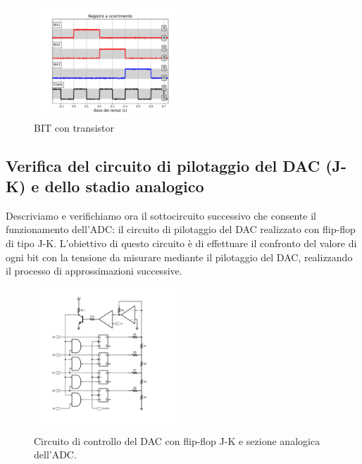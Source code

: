 \documentclass[journal]{IEEEtran}
\begin{document}
\begin{figure}[H]%
\begin{center}
\includegraphics[trim = {0 0 0 0}, clip, width=0.50\textwidth]{analysis/output/reg_test.pdf}
\caption{BIT con transistor}
\label{fig:BIT_with_transistor}
\end{center}
\end{figure}

\subsection{Verifica del circuito di pilotaggio del DAC (J-K) e dello stadio analogico}
Descriviamo e verifichiamo ora il sottocircuito successivo che consente il funzionamento dell'ADC: il circuito di pilotaggio del DAC realizzato con flip-flop di tipo J-K. L'obiettivo di questo circuito è di effettuare il confronto del valore di ogni bit con la tensione da misurare mediante il pilotaggio del DAC, realizzando il processo di approssimazioni successive. 

\begin{figure}[H]%
\begin{center}
\includegraphics[width=0.48\textwidth]{sch-simulations/digital/output/DAC.pdf}
\caption{Circuito di controllo del DAC con flip-flop J-K e sezione analogica dell'ADC.}
\label{fig:circuit_DAC_JK_transistor}
\end{center}
\end{figure}
\end{document}
